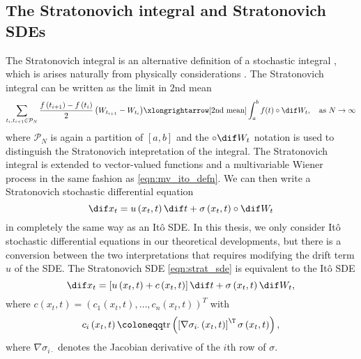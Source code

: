 \subsection{The Stratonovich integral and Stratonovich SDEs}
The Stratonovich integral is an alternative definition of a stochastic integral \citehere, which is arises naturally from physically considerations \citep{}.
The Stratonovich integral can be written as the limit in \(2\)nd mean
\[
	\sum_{t_i, t_{i+1} \in \mathcal{P}_N}{\frac{f\left(t_{i+1}\right) - f\left(t_i\right)}{2}\left(W_{t_{i+1}} - W_{t_i}\right)} \xlongrightarrow[2\text{nd mean}]{} \int_a^{b}{f(t)\circ\dif W_t}, \quad \text{as } N \to \infty
\]
where \(\mathcal{P}_N\) is again a partition of \([a,b]\) and the \(\circ \dif W_t\) notation is used to distinguish the Stratonovich intepretation of the integral.
The Stratonovich integral is extended to vector-valued functions and a multivariable Wiener process in the same fashion as \eqref{eqn:mv_ito_defn}.
We can then write a Stratonovich stochastic differential equation
\begin{equation}
	\dif x_t = u\left(x_t, t\right)\dif t + \sigma\left(x_t, t\right)\circ \dif W_t
	\label{eqn:strat_sde}
\end{equation}
in completely the same way as an It\^o SDE.
In this thesis, we only consider It\^o stochastic differential equations in our theoretical developments, but there is a conversion between the two interpretations that requires modifying the drift term \(u\) of the SDE.
The Stratonovich SDE \eqref{eqn:strat_sde} is equivalent to the It\^o SDE \citehere
\begin{equation}
	\dif x_t = \left[u\left(x_t, t\right) + c\left(x_t, t\right)\right]\dif t + \sigma\left(x_t, t\right)\dif W_t,
	\label{eqn:strat_ito_conv}
\end{equation}
where \(c\left(x_t, t\right) = \left(c_1\left(x_t, t\right), \dotsc, c_n\left(x_t, t\right)\right)^T\) with
\[
	c_i\left(x_t, t\right) \coloneqq \mathrm{tr}\left(\left[\nabla\sigma_{i\cdot}\left(x_t, t\right)\right]^{\T}\sigma\left(x_t, t\right)\right),
\]
where \(\nabla \sigma_{i\cdot}\) denotes the Jacobian derivative of the \(i\)th row of \(\sigma\).
